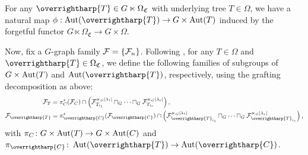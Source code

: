 \documentclass[a4paper,10pt
,draft
]{article}%
\renewcommand{\F}{\mathcal F}
\renewcommand{\1}{\eta}%
\newcommand{\vect}[1]{\text{\overrightharp{\ensuremath{#1}}}}
\begin{document}
\begin{remark}
      For any $\vect T \in G \ltimes \Omega_{\mathfrak C}$ with underlying tree $T \in \Omega$,
      we have a natural map $\phi: \Aut(\vect T) \to G \times \Aut(T)$ induced by the forgetful functor $G \ltimes \Omega_{\mathfrak C} \to G \times \Omega$.

      Now, fix a $G$-graph family $\mathcal F = \set{\F_n}$.
      Following \cite[Prop. 6.44, Lemma 6.49]{BP_geo}, for any $T \in \Omega$ and $\vect T \in \Omega_{\mathfrak C}$,
      we define the following families of subgroups of $G \times \operatorname{Aut}(T)$ and $\Aut(\vect T)$, respectively,
      using the grafting decomposition as above:
      \begin{align*}
        \F_T &= \pi_C^{\**}(\F_C) \cap \left( \F_{T_{i_1}}^{\ltimes_G |\lambda_1|} \sqcap_G \dots \sqcap_G \F_{T_{i_r}}^{\ltimes_G |\lambda_r|} \right),
        \\
        \F_{\vect T} &= \pi_{\vect C}^{\**}(\F_{\vect C}) \cap \left( \F_{\vect T_{i_1}}^{\ltimes_G |\lambda_1|} \sqcap_G \dots \sqcap_G \F_{\vect T_{i_s}}^{\ltimes_G |\lambda_s|} \right),
      \end{align*}
      with $\pi_C \colon G \times \operatorname{Aut}(T) \to G \times \operatorname{Aut}(C)$ and $\pi_{\vect C} \colon \Aut(\vect T) \to \Aut(\vect C)$.
\end{remark}
\end{document}
